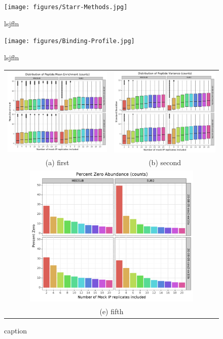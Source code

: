 \documentclass{article}
\newcommand{\beginsupplement}{%
        \setcounter{table}{0}
        \renewcommand{\thetable}{S\arabic{table}}%
        \setcounter{figure}{0}
        \renewcommand{\thefigure}{S\arabic{figure}}%
     }
\begin{document}
\begin{figure}[h]
\centering
\texttt{[image: figures/Starr-Methods.jpg]}
\caption{lsjfln}
\label{fig:Starr-Methods}
\end{figure}

\begin{figure}[h]
\centering
\texttt{[image: figures/Binding-Profile.jpg]}
\caption{lsjfln}
\label{fig:Binding-Profile}
\end{figure}


\begin{figure}
\centering
\begin{tabular}{cc}
  \includegraphics[width=65mm]{figures/42_mockip_abundance_variance/counts/mean_limit_y.pdf} &   \includegraphics[width=65mm]{figures/42_mockip_abundance_variance/counts/std_limit_y.pdf} \\
(a) first & (b) second \\[6pt]
\multicolumn{2}{c}{\includegraphics[width=85mm]{figures/42_mockip_abundance_variance/counts/per-zero.pdf} }\\
\multicolumn{2}{c}{(e) fifth}
\end{tabular}
\caption{caption}
\end{figure}

\end{document}
